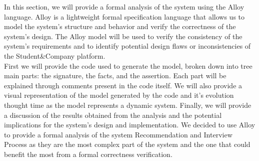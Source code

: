 In this section, we will provide a formal analysis of the system using the Alloy language. Alloy is a lightweight formal specification language that allows us to model the system's structure and behavior and verify the correctness of the system's design. The Alloy model will be used to verify the consistency of the system's requirements and to identify potential design flaws or inconsistencies of the Student\&Company platform. \\
First we will provide the code used to generate the model, broken down into tree main parts: the signature, the facts, and the assertion. Each part will be explained through comments present in the code itself. We will also provide a visual representation of the model generated by the code and it's evolution thought time as the model represents a dynamic system.
Finally, we will provide a discussion of the results obtained from the analysis and the potential implications for the system's design and implementation.
We decided to use Alloy to provide a formal analysis of the system Recommendation and Interview Process as they are the most complex part of the system and the one that could benefit the most from a formal correctness verification.

